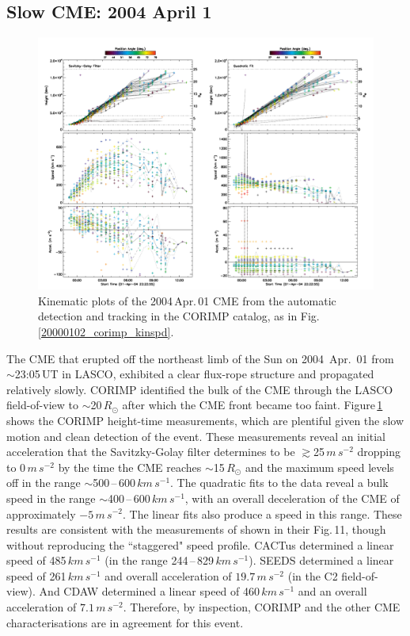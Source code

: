 \documentclass[referee,a4paper,12pt,traditabstract]{swsc}
\begin{document}
\subsection{Slow CME: 2004 April 1}


\begin{figure}[t]
\centerline{\includegraphics[width=\linewidth]{20040401_corimp_kinspd.pdf}}
\caption{Kinematic plots of the 2004\,Apr.\,01 CME from the automatic detection and tracking in the CORIMP catalog, as in Fig.\,\ref{20000102_corimp_kinspd}.}
\label{20040401_corimp_kinspd}
\end{figure}

The CME that erupted off the northeast limb of the Sun on 2004~Apr.~01 from $\sim$23:05\,UT in LASCO, exhibited a clear flux-rope structure and propagated relatively slowly. CORIMP identified the bulk of the CME through the LASCO field-of-view to $\sim$20\,$R_\odot$ after which the CME front became too faint. Figure\,\ref{20040401_corimp_kinspd} shows the CORIMP height-time measurements, which are plentiful given the slow motion and clean detection of the event. These measurements reveal an initial acceleration that the Savitzky-Golay filter determines to be $\gtrsim$25\,$m\,s^{-2}$ dropping to 0\,$m\,s^{-2}$ by the time the CME reaches $\sim$15\,$R_\odot$ and the maximum speed levels off in the range $\sim$500\,--\,600\,$km\,s^{-1}$. The quadratic fits to the data reveal a bulk speed in the range $\sim$400\,--\,600\,$km\,s^{-1}$, with an overall deceleration of the CME of approximately $-5\,m\,s^{-2}$. The linear fits also produce a speed in this range. These results are consistent with the measurements of \cite{2009A&A...495..325B} shown in their Fig.\,11, though without reproducing the ``staggered" speed profile. CACTus determined a linear speed of 485$\,km\,s^{-1}$ (in the range 244\,--\,829\,$km\,s^{-1}$). SEEDS determined a linear speed of 261\,$km\,s^{-1}$ and overall acceleration of $19.7\,m\,s^{-2}$ (in the C2 field-of-view). And CDAW determined a linear speed of 460$\,km\,s^{-1}$ and an overall acceleration of $7.1\,m\,s^{-2}$. Therefore, by inspection, CORIMP and the other CME characterisations are in agreement for this event.
\end{document}
